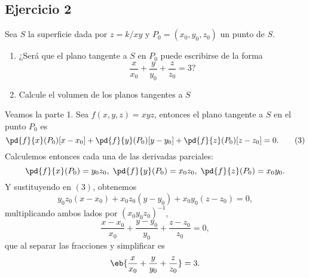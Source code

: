\subsection*{Ejercicio 2}
	Sea $S$ la superficie dada por $z=k/xy$ y $P_0 = (x_0,y_0,z_0)$ un punto de $S$.
\begin{enumerate}
	\item ¿Será que el plano tangente a $S$ en $P_0$ puede escribirse de la forma
	\[ \frac{x}{x_0} + \frac{y}{y_0} + \frac{z}{z_0} = 3? \] 
	\item Calcule el volumen de los planos tangentes a $S$
\end{enumerate}
\begin{sol} 
	Veamos la parte 1. Sea $f(x,y,z) = xyz$, entonces el plano tangente a $S$ en el punto $P_0$ es
	\[ \pd{f}{x}(P_0)[x-x_0]+\pd{f}{y}(P_0)[y-y_0]+\pd{f}{z}(P_0)[z-z_0] = 0. \tag{3} \]
	Calculemos entonces cada una de las derivadas parciales:
	\[ \pd{f}{x}(P_0) = y_0z_0, \; \pd{f}{y}(P_0)=x_0z_0, \; \pd{f}{z}(P_0)=x_0y_0 . \]
	Y sustituyendo en $(3)$, obtenemos
	\[ y_0z_0(x-x_0) + x_0z_0(y-y_0) + x_0y_0(z-z_0) = 0,  \]
	multiplicando ambos lados por $(x_0y_0z_0)^{-1}$,
	\[ \frac{x-x_0}{x_0} + \frac{y-y_0}{y_0} + \frac{z-z_0}{z_0} = 0, \]
	que al separar las fracciones y simplificar es
	\[ \eb{\frac{x}{x_0} + \frac{y}{y_0} + \frac{z}{z_0}} = 3. \]
\end{sol}

